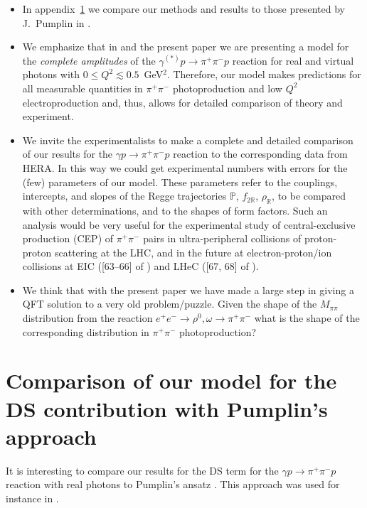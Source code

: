 \documentclass[a4paper,11pt]{article}
\newcommand{\Pom}{\mathbb{P}}
\newcommand{\Reg}{\mathbb{R}}
\begin{document}
\begin{itemize}
\item
In appendix~\ref{sec:A}
we compare our methods and results to those presented
by J.~Pumplin in \cite{Pumplin:1970kp}.

\item
We emphasize that in \cite{Lebiedowicz:2025xob} and the present paper
we are presenting a model for the \textit{complete amplitudes}
of the $\gamma^{(*)} p \to \pi^{+} \pi^{-} p$ reaction
for real and virtual photons with 
$0 \leqslant Q^{2} \lesssim 0.5$~GeV$^{2}$.
Therefore, our model makes predictions for all measurable
quantities in $\pi^{+} \pi^{-}$ photoproduction
and low $Q^{2}$ electroproduction and, thus,
allows for detailed comparison of theory and experiment.

\item
We invite the experimentalists to make a complete and detailed comparison
of our results for the $\gamma p \to \pi^{+} \pi^{-} p$ reaction
to the corresponding data from HERA.
In this way we could get experimental numbers with errors for the (few)
parameters of our model.
These parameters refer to the couplings, intercepts, and slopes of the Regge
trajectories $\Pom$, $f_{2 \Reg}$, $\rho_{\Reg}$, to be compared
with other determinations, and to the shapes of form factors.
Such an analysis would be very useful for the experimental study
of central-exclusive production (CEP) of $\pi^{+}\pi^{-}$ pairs
in ultra-peripheral collisions of proton-proton scattering at the LHC,
and in the future at electron-proton/ion collisions at 
EIC ([63--66] of \cite{Lebiedowicz:2025xob}) 
and LHeC ([67, 68] of \cite{Lebiedowicz:2025xob}).

\item
We think that with the present paper we have made a large step in giving
a QFT solution to a very old problem/puzzle.
Given the shape of the $M_{\pi \pi}$ distribution from the reaction
$e^{+} e^{-} \to \rho^{0}, \omega \to \pi^{+} \pi^{-}$
what is the shape of the corresponding distribution in
$\pi^{+} \pi^{-}$ photoproduction?

\end{itemize}

\appendix

\section{Comparison of our model for the DS contribution with Pumplin's approach}
\label{sec:A}

It is interesting to compare our results for the DS term
for the $\gamma p \to \pi^{+} \pi^{-} p$ reaction
with real photons to Pumplin's ansatz \cite{Pumplin:1970kp}.
This approach was used for instance in \cite{Szczurek:2004xe,
JointPhysicsAnalysisCenter:2024qld}. 
\end{document}
